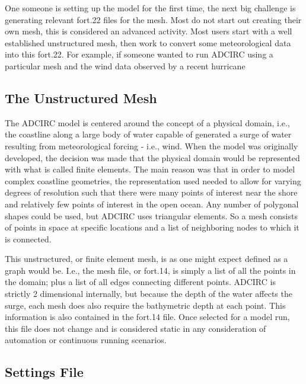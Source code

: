 \documentclass{article}
\begin{document}
One someone is setting up the model for the first time, the next big challenge
is generating relevant fort.22 files for the mesh. Most do not start out
creating their own mesh, this is considered an advanced activity. Most users
start with a well established unstructured mesh, then work to convert some
meteorological data into this fort.22. For example, if someone wanted to run
ADCIRC using a particular mesh and the wind data observed by a recent hurricane

\subsection{The Unstructured Mesh}

The ADCIRC model is centered around the concept of a physical domain, i.e., the
coastline along a large body of water capable of generated a surge of water
resulting from meteorological forcing - i.e., wind. When the model was
originally developed, the decision was made that the physical domain would be
represented with what is called finite elements.  The main reason was that in
order to model complex coastline geometries, the representation used needed to
allow for varying degrees of resolution such that there were many points of
interest near the shore and relatively few points of interest in the open ocean.
Any number of polygonal shapes could be used, but ADCIRC uses triangular
elements. So a mesh consists of points in space at specific locations and a list
of neighboring nodes to which it is connected.

This unstructured, or finite element mesh, is as one might expect defined as a
graph would be. I.e., the mesh file, or fort.14, is simply a list of all the
points in the domain; plus a list of all edges connecting different points.
ADCIRC is strictly 2 dimensional internally, but because the depth of the water
affects the surge, each mesh does also require the bathymetric depth at each
point. This information is also contained in the fort.14 file.  Once selected
for a model run, this file does not change and is considered static in any
consideration of automation or continuous running scenarios.

\subsection{Settings File}
\end{document}
